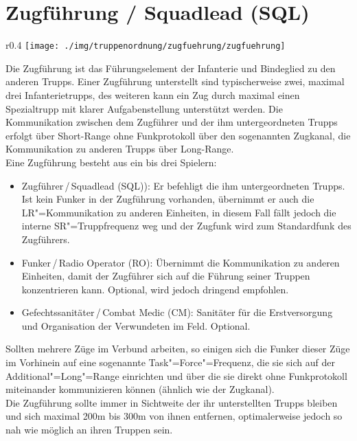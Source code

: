 \section{Zugführung / Squadlead (SQL)}
\begin{wrapfigure}{r}{0.4\textwidth}
	\centering 
	\vspace{-20pt}
	\texttt{[image: ./img/truppenordnung/zugfuehrung/zugfuehrung]}
	\vspace{-50pt}
\end{wrapfigure}
Die Zugführung ist das Führungselement der Infanterie und Bindeglied zu den anderen Trupps. Einer Zugführung unterstellt sind typischerweise zwei, maximal drei Infanterietrupps, des weiteren kann ein Zug durch maximal einen Spezialtrupp mit klarer Aufgabenstellung unterstützt werden. Die Kommunikation zwischen dem Zugführer und der ihm untergeordneten Trupps erfolgt über Short-Range ohne Funkprotokoll über den sogenannten Zugkanal, die Kommunikation zu anderen Trupps über Long-Range.\\

Eine Zugführung besteht aus ein bis drei Spielern:
\begin{itemize}
	\item Zugführer\,/\,Squadlead (SQL)): Er befehligt die ihm untergeordneten Trupps. Ist kein Funker in der Zugführung vorhanden, übernimmt er auch die LR"=Kommunikation zu anderen Einheiten, in diesem Fall fällt jedoch die interne SR"=Truppfrequenz weg und der Zugfunk wird zum Standardfunk des Zugführers.
	\item Funker\,/\,Radio Operator (RO): Übernimmt die Kommunikation zu anderen Einheiten, damit der Zugführer sich auf die Führung seiner Truppen konzentrieren kann. Optional, wird jedoch dringend empfohlen.
	\item Gefechtssanitäter\,/\,Combat Medic (CM): Sanitäter für die Erstversorgung und Organisation der Verwundeten im Feld. Optional.
\end{itemize}
Sollten mehrere Züge im Verbund arbeiten, so einigen sich die Funker dieser Züge im Vorhinein auf eine sogenannte Task"=Force"=Frequenz, die sie sich auf der Additional"=Long"=Range einrichten und über die sie direkt ohne Funkprotokoll miteinander kommunizieren können (ähnlich wie der Zugkanal).\\
Die Zugführung sollte immer in Sichtweite der ihr unterstellten Trupps bleiben und sich maximal 200m bis 300m von ihnen entfernen, optimalerweise jedoch so nah wie möglich an ihren Truppen sein.